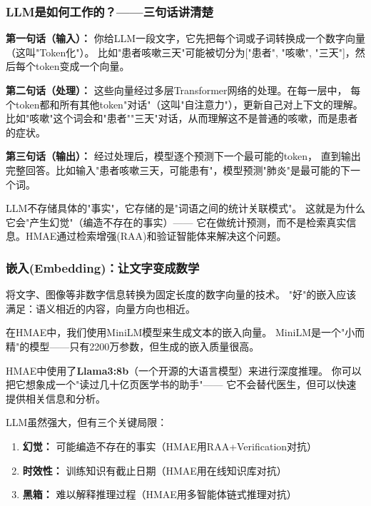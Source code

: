 \documentclass[11pt,a4paper]{ctexart}
\begin{document}
\subsubsection{LLM是如何工作的？——三句话讲清楚}

\textbf{第一句话（输入）：} 你给LLM一段文字，它先把每个词或子词转换成一个数字向量（这叫"Token化"）。
比如"患者咳嗽三天"可能被切分为["患者", "咳嗽", "三天"]，然后每个token变成一个向量。

\textbf{第二句话（处理）：} 这些向量经过多层Transformer网络的处理。在每一层中，
每个token都和所有其他token"对话"（这叫"自注意力"），更新自己对上下文的理解。
比如"咳嗽"这个词会和"患者""三天"对话，从而理解这不是普通的咳嗽，而是患者的症状。

\textbf{第三句话（输出）：} 经过处理后，模型逐个预测下一个最可能的token，
直到输出完整回答。比如输入"患者咳嗽三天，可能患有"，模型预测"肺炎"是最可能的下一个词。

\begin{keybox}[LLM不是数据库]
LLM不存储具体的"事实"，它存储的是"词语之间的统计关联模式"。
这就是为什么它会"产生幻觉"（编造不存在的事实）——
它在做统计预测，而不是检索真实信息。HMAE通过检索增强(RAA)和验证智能体来解决这个问题。
\end{keybox}

\subsubsection{嵌入(Embedding)：让文字变成数学}

\begin{defbox}[嵌入 (Embedding)]
将文字、图像等非数字信息转换为固定长度的数字向量的技术。
"好"的嵌入应该满足：语义相近的内容，向量方向也相近。
\end{defbox}

在HMAE中，我们使用MiniLM模型来生成文本的嵌入向量。
MiniLM是一个"小而精"的模型——只有2200万参数，但生成的嵌入质量很高。

HMAE中使用了\textbf{Llama3:8b}（一个开源的大语言模型）来进行深度推理。
你可以把它想象成一个"读过几十亿页医学书的助手"——
它不会替代医生，但可以快速提供相关信息和分析。

\begin{warnbox}[LLM的局限]
LLM虽然强大，但有三个关键局限：
\begin{enumerate}[nosep]
\item \textbf{幻觉：} 可能编造不存在的事实（HMAE用RAA+Verification对抗）
\item \textbf{时效性：} 训练知识有截止日期（HMAE用在线知识库对抗）
\item \textbf{黑箱：} 难以解释推理过程（HMAE用多智能体链式推理对抗）
\end{enumerate}
\end{warnbox}
\end{document}
